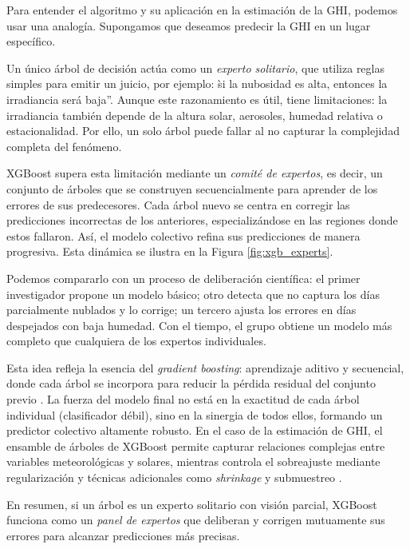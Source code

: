 \documentclass[letterpaper,12pt, twoside]{report}
\providecommand{\DIFdeltex}[1]{{\protect\color{red} \scriptsize #1}} %
\providecommand{\DIFdel}[1]{\texorpdfstring{\DIFdeltex{#1}}{}} %
\begin{document}
\DIFdel{Para entender el algoritmo y su aplicación en la estimación de la GHI, podemos usar una analogía. Supongamos que deseamos predecir la GHI en un lugar específico.
}%

\DIFdel{Un único árbol de decisión actúa como un \textit{experto solitario}, que utiliza reglas simples para emitir un juicio, por ejemplo: \`si la nubosidad es alta, entonces la irradiancia será baja''. Aunque este razonamiento es útil, tiene limitaciones: la irradiancia también depende de la altura solar, aerosoles, humedad relativa o estacionalidad. Por ello, un solo árbol puede fallar al no capturar la complejidad completa del fenómeno.
}%

\DIFdel{XGBoost supera esta limitación mediante un \textit{comité de expertos}, es decir, un conjunto de árboles que se construyen secuencialmente para aprender de los errores de sus predecesores. Cada árbol nuevo se centra en corregir las predicciones incorrectas de los anteriores, especializándose en las regiones donde estos fallaron. Así, el modelo colectivo refina sus predicciones de manera progresiva. Esta dinámica se ilustra en la Figura \ref{fig:xgb_experts}.
}%

\DIFdel{Podemos compararlo con un proceso de deliberación científica: el primer investigador propone un modelo básico; otro detecta que no captura los días parcialmente nublados y lo corrige; un tercero ajusta los errores en días despejados con baja humedad. Con el tiempo, el grupo obtiene un modelo más completo que cualquiera de los expertos individuales.}%

\DIFdel{Esta idea refleja la esencia del \textit{gradient boosting}: aprendizaje aditivo y secuencial, donde cada árbol se incorpora para reducir la pérdida residual del conjunto previo \cite{chen2016xgboost}. La fuerza del modelo final no está en la exactitud de cada árbol individual (clasificador débil), sino en la sinergia de todos ellos, formando un predictor colectivo altamente robusto.
En el caso de la estimación de GHI, el ensamble de árboles de XGBoost permite capturar relaciones complejas entre variables meteorológicas y solares, mientras controla el sobreajuste mediante regularización y técnicas adicionales como \textit{shrinkage} y submuestreo \cite{xgboostdoc}.
}%

\DIFdel{En resumen, si un árbol es un experto solitario con visión parcial, XGBoost funciona como un \textit{panel de expertos} que deliberan y corrigen mutuamente sus errores para alcanzar predicciones más precisas.
}%
\end{document}
